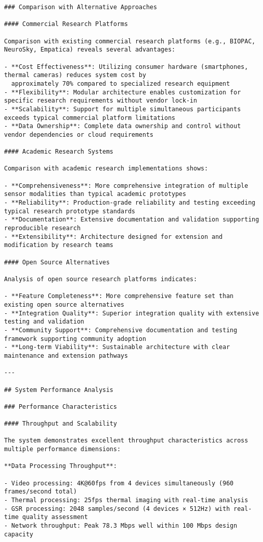 \documentclass[11pt,a4paper]{report}
\begin{document}
\begin{verbatim}
### Comparison with Alternative Approaches

#### Commercial Research Platforms

Comparison with existing commercial research platforms (e.g., BIOPAC, NeuroSky, Empatica) reveals several advantages:

- **Cost Effectiveness**: Utilizing consumer hardware (smartphones, thermal cameras) reduces system cost by
  approximately 70% compared to specialized research equipment
- **Flexibility**: Modular architecture enables customization for specific research requirements without vendor lock-in
- **Scalability**: Support for multiple simultaneous participants exceeds typical commercial platform limitations
- **Data Ownership**: Complete data ownership and control without vendor dependencies or cloud requirements

#### Academic Research Systems

Comparison with academic research implementations shows:

- **Comprehensiveness**: More comprehensive integration of multiple sensor modalities than typical academic prototypes
- **Reliability**: Production-grade reliability and testing exceeding typical research prototype standards
- **Documentation**: Extensive documentation and validation supporting reproducible research
- **Extensibility**: Architecture designed for extension and modification by research teams

#### Open Source Alternatives

Analysis of open source research platforms indicates:

- **Feature Completeness**: More comprehensive feature set than existing open source alternatives
- **Integration Quality**: Superior integration quality with extensive testing and validation
- **Community Support**: Comprehensive documentation and testing framework supporting community adoption
- **Long-term Viability**: Sustainable architecture with clear maintenance and extension pathways

---

## System Performance Analysis

### Performance Characteristics

#### Throughput and Scalability

The system demonstrates excellent throughput characteristics across multiple performance dimensions:

**Data Processing Throughput**:

- Video processing: 4K@60fps from 4 devices simultaneously (960 frames/second total)
- Thermal processing: 25fps thermal imaging with real-time analysis
- GSR processing: 2048 samples/second (4 devices × 512Hz) with real-time quality assessment
- Network throughput: Peak 78.3 Mbps well within 100 Mbps design capacity


\end{verbatim}
\end{document}
